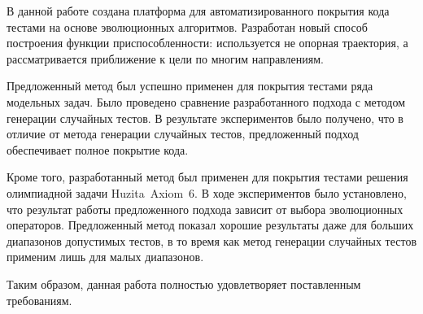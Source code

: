 \startconclusionpage

В данной работе создана платформа для автоматизированного покрытия кода тестами на основе эволюционных алгоритмов. Разработан новый способ построения функции 
приспособленности: используется не опорная траектория, а рассматривается приближение к цели по многим направлениям.

Предложенный метод был успешно применен для покрытия тестами ряда модельных задач. Было проведено сравнение разработанного подхода с методом генерации 
случайных тестов. В результате экспериментов было получено, что в отличие от метода генерации случайных тестов, предложенный подход обеспечивает полное 
покрытие кода.

Кроме того, разработанный метод был применен для покрытия тестами решения олимпиадной задачи Huzita~Axiom~6. В ходе экспериментов было установлено, что 
результат работы предложенного подхода зависит от выбора эволюционных операторов. Предложенный метод показал хорошие результаты даже для больших диапазонов 
допустимых тестов, в то время как метод генерации случайных тестов применим лишь для малых диапазонов.

Таким образом, данная работа полностью удовлетворяет поставленным требованиям.